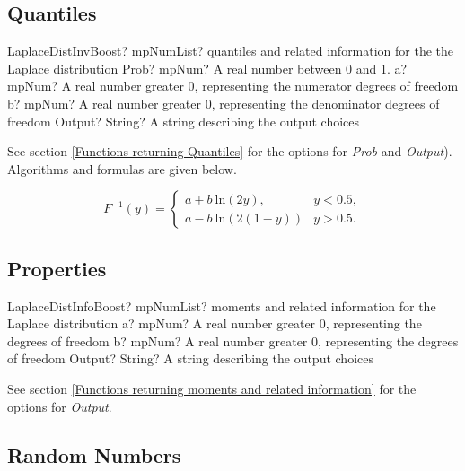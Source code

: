 \subsection{Quantiles}
\begin{mpFunctionsExtract}
	\mpFunctionFourNotImplemented
	{LaplaceDistInvBoost? mpNumList? quantiles and related information for the the Laplace distribution}
	{Prob? mpNum? A real number between 0 and 1.}
	{a? mpNum? A real number greater 0, representing the numerator  degrees of freedom}
	{b? mpNum? A real number greater 0, representing the denominator degrees of freedom}
	{Output? String? A string describing the output choices}
\end{mpFunctionsExtract}

See section \ref{Functions returning Quantiles} for the options for  {\itshape\sffamily Prob} and {\itshape\sffamily Output}). Algorithms and formulas are given below.

\vspace{0.3cm}
\begin{equation}
	F^{-1}(y)=\begin{cases}
		a+b \: \text{ln}(2y), & y<0.5,\\
		a-b \: \text{ln}(2(1-y))  & y>0.5.
	\end{cases}
\end{equation}



\subsection{Properties}
\label{LaplaceDistributionProperties}

\begin{mpFunctionsExtract}
	\mpFunctionThreeNotImplemented
	{LaplaceDistInfoBoost? mpNumList? moments and related information for the Laplace distribution}
	{a? mpNum? A real number greater 0, representing the degrees of freedom}
	{b? mpNum? A real number greater 0, representing the degrees of freedom}
	{Output? String? A string describing the output choices}
\end{mpFunctionsExtract}

\vspace{0.3cm}

See section \ref{Functions returning moments and related information} for the options for {\itshape\sffamily Output}. 



\subsection{Random Numbers}

